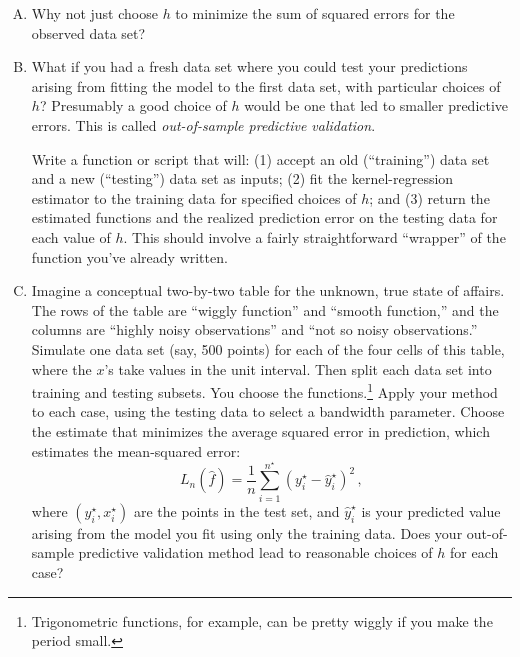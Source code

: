 \documentclass{mynotes}
\begin{document}
\begin{enumerate}[(A)]

\item Why not just choose $h$ to minimize the sum of squared errors for the observed data set?

\item  What if you had a fresh data set where you could test your predictions arising from fitting the model to the first data set, with particular choices of $h$?  Presumably a good choice of $h$ would be one that led to smaller predictive errors.  This is called \textit{out-of-sample predictive validation}.

Write a function or script that will: (1) accept an old (``training'') data set and a new (``testing'') data set as inputs; (2) fit the kernel-regression estimator to the training data for specified choices of $h$; and (3) return the estimated functions and the realized prediction error on the testing data for each value of $h$.  This should involve a fairly straightforward ``wrapper'' of the function you've already written.

\item Imagine a conceptual two-by-two table for the unknown, true state of affairs.  The rows of the table are ``wiggly function'' and ``smooth function,'' and the columns are ``highly noisy observations'' and ``not so noisy observations.''  Simulate one data set (say, 500 points) for each of the four cells of this table, where the $x$'s take values in the unit interval.  Then split each data set into training and testing subsets.  You choose the functions.\footnote{Trigonometric functions, for example, can be pretty wiggly if you make the period small.}   Apply your method to each case, using the testing data to select a bandwidth parameter.  Choose the estimate that minimizes the average squared error in prediction, which estimates the mean-squared error:
$$
L_n(\hat{f}) = \frac{1}{n}\sum_{i=1}^{n^{\star}} (y^{\star}_i - \hat{y}_i^{\star} )^2 \, ,
$$
where $(y_i^{\star}, x_i^{\star})$ are the points in the test set, and $ \hat{y}_i^{\star}$ is your predicted value arising from the model you fit using only the training data.  Does your out-of-sample predictive validation method lead to reasonable choices of $h$ for each case?


\end{enumerate}
\end{document}
